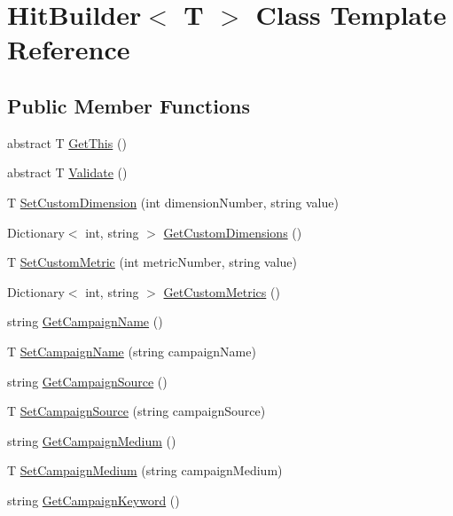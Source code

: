 \hypertarget{class_hit_builder}{}\section{Hit\+Builder$<$ T $>$ Class Template Reference}
\label{class_hit_builder}
\subsection*{Public Member Functions}
\begin{DoxyCompactItemize}
\item 
abstract T \hyperlink{class_hit_builder_a4276c57427406e264dc33f8c900ad530}{Get\+This} ()
\item 
abstract T \hyperlink{class_hit_builder_a0f4833828bd530bb057c9ca359584bce}{Validate} ()
\item 
T \hyperlink{class_hit_builder_a142d3073dedfb4b0d8dd9d44ddc22d30}{Set\+Custom\+Dimension} (int dimension\+Number, string value)
\item 
Dictionary$<$ int, string $>$ \hyperlink{class_hit_builder_a72ab75920631300d1042354eff9827f5}{Get\+Custom\+Dimensions} ()
\item 
T \hyperlink{class_hit_builder_a400ca3be59a49d15453cab6fdc8e0c91}{Set\+Custom\+Metric} (int metric\+Number, string value)
\item 
Dictionary$<$ int, string $>$ \hyperlink{class_hit_builder_aaca7cbe18c9a1f6a67674f87a280a284}{Get\+Custom\+Metrics} ()
\item 
string \hyperlink{class_hit_builder_a610c6edc4b4597a15c4ff40d13d18c2c}{Get\+Campaign\+Name} ()
\item 
T \hyperlink{class_hit_builder_a5079f79a4c1758aa82b85786d9600e1b}{Set\+Campaign\+Name} (string campaign\+Name)
\item 
string \hyperlink{class_hit_builder_a8b94ce3ef09ac40269d204f6db5f7eeb}{Get\+Campaign\+Source} ()
\item 
T \hyperlink{class_hit_builder_acd475a4aaf0249b408d80fa454f27a52}{Set\+Campaign\+Source} (string campaign\+Source)
\item 
string \hyperlink{class_hit_builder_aca044ca6b6f99a4d871344bbcded1b4c}{Get\+Campaign\+Medium} ()
\item 
T \hyperlink{class_hit_builder_a6057460657162ac72cc0412a218c6018}{Set\+Campaign\+Medium} (string campaign\+Medium)
\item 
string \hyperlink{class_hit_builder_a9203f40c77a69afbe914b0d0bab731f1}{Get\+Campaign\+Keyword} ()

\end{DoxyCompactItemize}
